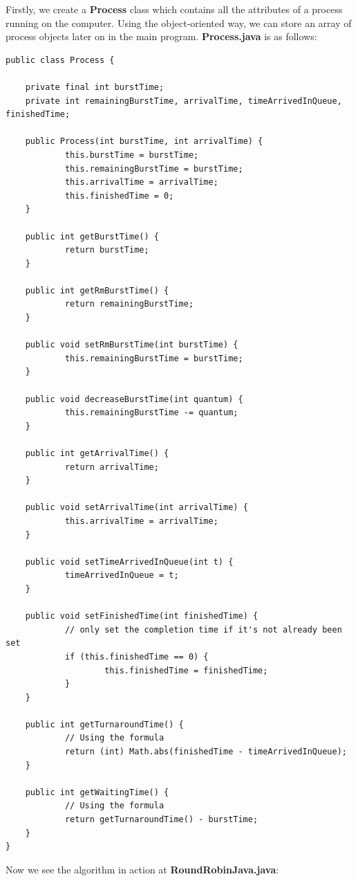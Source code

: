 \documentclass[12pt]{article}
\begin{document}
Firstly, we create a \textbf{Process} class which contains all the attributes of
a process running on the computer. Using the object-oriented way, we can store
an array of process objects later on in the main program. \textbf{Process.java}
is as follows:

\begin{lstlisting}
public class Process {

	private final int burstTime;
	private int remainingBurstTime, arrivalTime, timeArrivedInQueue, finishedTime;

	public Process(int burstTime, int arrivalTime) {
			this.burstTime = burstTime;
			this.remainingBurstTime = burstTime;
			this.arrivalTime = arrivalTime;
			this.finishedTime = 0;
	}

	public int getBurstTime() {
			return burstTime;
	}

	public int getRmBurstTime() {
			return remainingBurstTime;
	}

	public void setRmBurstTime(int burstTime) {
			this.remainingBurstTime = burstTime;
	}

	public void decreaseBurstTime(int quantum) {
			this.remainingBurstTime -= quantum;
	}

	public int getArrivalTime() {
			return arrivalTime;
	}

	public void setArrivalTime(int arrivalTime) {
			this.arrivalTime = arrivalTime;
	}

	public void setTimeArrivedInQueue(int t) {
			timeArrivedInQueue = t;
	}

	public void setFinishedTime(int finishedTime) {
			// only set the completion time if it's not already been set
			if (this.finishedTime == 0) {
					this.finishedTime = finishedTime;
			}
	}

	public int getTurnaroundTime() {
			// Using the formula
			return (int) Math.abs(finishedTime - timeArrivedInQueue);
	}

	public int getWaitingTime() {
			// Using the formula
			return getTurnaroundTime() - burstTime;
	}
}
\end{lstlisting}

Now we see the algorithm in action at \textbf{RoundRobinJava.java}:
\end{document}

